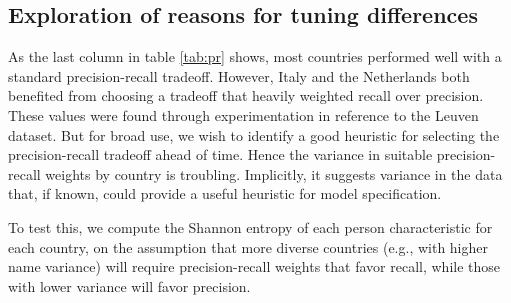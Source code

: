 \documentclass[11pt]{article}
\begin{document}
\subsection{Exploration of reasons for tuning differences}
\label{sec:expl-reas-tuning}

As the last column in table \ref{tab:pr} shows, most countries
performed well with a standard precision-recall tradeoff. However,
Italy and the Netherlands both benefited from choosing a tradeoff that
heavily weighted recall over precision. These values were found
through experimentation in reference to the Leuven dataset. But for
broad use, we wish to identify a good heuristic for selecting the
precision-recall tradeoff ahead of time. Hence the variance in
suitable precision-recall weights by country is troubling. Implicitly,
it suggests variance in the data that, if known, could provide a
useful heuristic for model specification.

To test this, we compute the Shannon entropy of each person characteristic
for each country, on the assumption that more diverse countries (e.g.,
with higher name variance) will require precision-recall weights that
favor recall, while those with lower variance will favor precision. 





\end{document}

